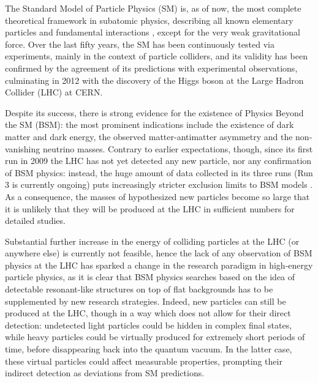 
The Standard Model of Particle Physics (SM) is, as of now, the most complete theoretical framework in subatomic physics, describing all known elementary particles and fundamental interactions \cite{Glashow-1961, Salam-1964, Weinberg-1967, Fritzsch-1972, Fritzsch-1973, Higgs-1964-1, Higgs-1964-2, Englert-1964, Guralnik-1964}, except for the very weak gravitational force. Over the last fifty years, the SM has been continuously tested via experiments, mainly in the context of particle colliders, and its validity has been confirmed by the agreement of its predictions with experimental observations, culminating in 2012 with the discovery of the Higgs boson \cite{ATLAS-2012, CMS-2012} at the Large Hadron Collider (LHC) at CERN.

Despite its success, there is strong evidence for the existence of Physics Beyond the SM (BSM): the most prominent indications include the existence of dark matter and dark energy, the observed matter-antimatter asymmetry and the non-vanishing neutrino masses. Contrary to earlier expectations, though, since its first run in 2009 the LHC has not yet detected any new particle, nor any confirmation of BSM physics: instead, the huge amount of data collected in its three runs (Run 3 is currently ongoing) puts increasingly stricter exclusion limits to BSM models \cite{CMS-ATLAS-SUSY, Bsekidt-2012, Ghosh-2025, Crivellin-2015}. As a consequence, the masses of hypothesized new particles become so large that it is unlikely that they will be produced at the LHC in sufficient numbers for detailed studies.

Substantial further increase in the energy of colliding particles at the LHC (or anywhere else) is currently not feasible, hence the lack of any observation of BSM physics at the LHC has sparked a change in the research paradigm in high-energy particle physics, as it is clear that BSM physics searches based on the idea of detectable resonant-like structures on top of flat backgrounds has to be supplemented by new research strategies. Indeed, new particles can still be produced at the LHC, though in a way which does not allow for their direct detection: undetected light particles could be hidden in complex final states, while heavy particles could be virtually produced for extremely short periods of time, before disappearing back into the quantum vacuum. In the latter case, these virtual particles could affect measurable properties, prompting their indirect detection as deviations from SM predictions.
%

